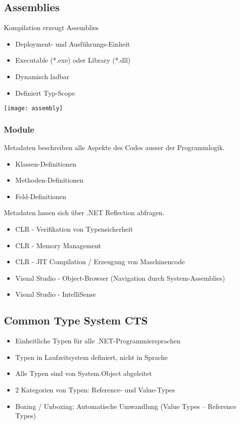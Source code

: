 \begin{multicols*}{2}
\subsection{Assemblies}
Kompilation erzeugt Assemblies
\begin{itemize}
    \item Deployment- und Ausführungs-Einheit
    \item Executable (*.exe) oder Library (*.dll)
    \item Dynamisch ladbar
    \item Definiert Typ-Scope
\end{itemize}
\texttt{[image: assembly]}
\subsubsection{Module}
Metadaten beschreiben alle Aspekte des Codes ausser der Programmlogik.
\begin{itemize}
    \item Klassen-Definitionen
    \item Methoden-Definitionen
    \item Feld-Definitionen
\end{itemize}
Metadaten lassen sich über .NET Reflection abfragen.
\begin{itemize}
    \item CLR - Verifikation von Typensicherheit
    \item CLR - Memory Management
    \item CLR - JIT Compilation / Erzeugung von Maschinencode
    \item Visual Studio - Object-Browser (Navigation durch System-Assemblies)
    \item Visual Studio - IntelliSense
\end{itemize}

\subsection{Common Type System CTS}
\begin{itemize}
    \item Einheitliche Typen für alle .NET-Programmiersprachen
    \item Typen in Laufzeitsystem definiert, nicht in Sprache
    \item Alle Typen sind von System.Object abgeleitet 
    \item 2 Kategorien von Typen: Reference- und Value-Types
    \item Boxing / Unboxing: Automatische Umwandlung (Value Types – Reference Types)
\end{itemize}

\end{multicols*}
